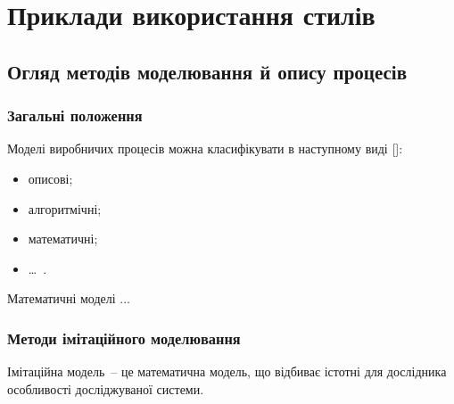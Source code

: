 \section{Приклади використання стилів}

\subsection{Огляд методів моделювання й опису процесів}
\subsubsection{Загальні положення}
Моделі виробничих процесів можна класифікувати в наступному виді []:
\begin{itemize}
\item описові;
\item алгоритмічні;
\item математичні;
\item \dots~.
\end{itemize}

Математичні моделі ...

\subsubsection{Методи імітаційного моделювання}
Імітаційна модель~-- це математична модель, що відбиває істотні для дослідника особливості досліджуваної системи.


